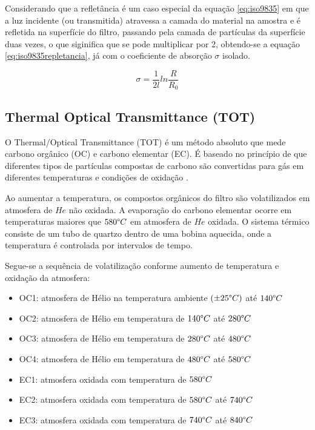 Considerando que a refletância é um caso especial da equação \ref{eq:iso9835} 
em que a luz incidente (ou transmitida) atravessa a camada do material na 
amostra e é refletida na superfície do filtro, passando pela camada de 
partículas da superfície duas vezes, o que siginifica que se pode
multiplicar  por 2, obtendo-se a equação 
\ref{eq:iso9835repletancia}, já com o coeficiente de absorção $\sigma$
isolado.

\begin{equation}
  \label{eq:iso9835refletancia}
  \sigma = \frac{1}{2l} ln\frac{R}{R_0}
\end{equation}
 

\subsection{Thermal Optical Transmittance (TOT)}

O Thermal/Optical Transmittance (TOT) é um método absoluto
que mede carbono orgânico (OC) e carbono elementar (EC).
É baseado no princípio  de que diferentes tipos de partículas
compostas de carbono são convertidas para gás em diferentes temperaturas e
condições de oxidação \citep{birch1998}.

Ao aumentar a temperatura, os compostos orgânicos do filtro são volatilizados 
em atmosfera de $He$ não oxidada.
A evaporação do carbono elementar ocorre em temperaturas maiores que 
$580 \degree C$ em atmosfera de $He$ oxidada.
O sistema térmico consiste de um tubo de quartzo dentro de uma bobina aquecida, 
onde a temperatura é controlada por intervalos de tempo.  

Segue-se a sequência de volatilização conforme aumento de temperatura e 
oxidação da atmosfera:

\begin{itemize}
  \item OC1: atmosfera de Hélio na temperatura ambiente $(\pm 25 \degree C)$ até $140 \degree C$
  \item OC2: atmosfera de Hélio em temperatura de $140 \degree C$ até $280 \degree C$
  \item OC3: atmosfera de Hélio em temperatura de $280 \degree C$ até $480 \degree C$
  \item OC4: atmosfera de Hélio em temperatura de $480 \degree C$ até $580 \degree C$
  \item EC1: atmosfera oxidada com temperatura de $580 \degree C$
  \item EC2: atmosfera oxidada com temperatura de $580 \degree C$ até $740 \degree C$
  \item EC3: atmosfera oxidada com temperatura de $740 \degree C$ até $840 \degree C$
\end{itemize}

